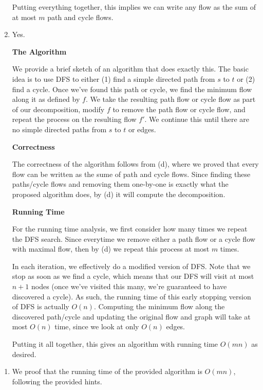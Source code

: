 \documentclass[12pt]{exam}
\newcommand{\Q}[1]{\question{\large{\textbf{#1}}}}
\begin{document}
\begin{questions}
\begin{solution}
\begin{enumerate}[label=(\alph*)]
      Putting everything together, this implies we can write any flow as the sum of at most $m$ path and cycle flows.
    \item
      Yes.


      \textbf{The Algorithm}
      
      We provide a brief sketch of an algorithm that does exactly this. The basic idea is to use DFS to either (1) find a simple directed path from $s$ to $t$ or (2) find a cycle. Once we've found this path or cycle, we find the minimum flow along it as defined by $f$. We take the resulting path flow or cycle flow as part of our decomposition, modify $f$ to remove the path flow or cycle flow, and repeat the process on the resulting flow $f'$. We continue this until there are no simple directed paths from $s$ to $t$ or edges.

      \textbf{Correctness}

      The correctness of the algorithm follows from (d), where we proved that every flow can be written as the sume of path and cycle flows. Since finding these paths/cycle flows and removing them one-by-one is exactly what the proposed algorithm does, by (d) it will compute the decomposition.

      \textbf{Running Time}

      For the running time analysis, we first consider how many times we repeat the DFS search. Since everytime we remove either a path flow or a cycle flow with maximal flow, then by (d) we repeat this process at most $m$ times.

      In each iteration, we effectively do a modified version of DFS. Note that we stop as soon as we find a cycle, which means that our DFS will visit at most $n + 1$ nodes (once we've visited this many, we're guaranteed to have discovered a cycle). As such, the running time of this early stopping version of DFS is actually $O(n)$. Computing the minimum flow along the discovered path/cycle and updating the original flow and graph will take at most $O(n)$ time, since we look at only $O(n)$ edges.

      Putting it all together, this gives an algorithm with running time $O(mn)$ as desired.

  \end{enumerate}
\end{solution}

\newpage
\Q{Problem 2}
\begin{solution}
  \begin{enumerate}[label=(\alph*)]
    \item
      We proof that the running time of the provided algorithm is $O(mn)$, following the provided hints.


\end{enumerate}
\end{solution}
\end{questions}
\end{document}
